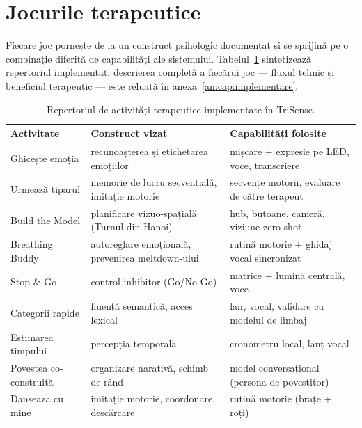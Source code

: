 \section{Jocurile terapeutice}

Fiecare joc pornește de la un construct psihologic documentat și se sprijină pe o combinație diferită de capabilități ale sistemului. Tabelul~\ref{tab:jocuri} sintetizează repertoriul implementat; descrierea completă a fiecărui joc — fluxul tehnic și beneficiul terapeutic — este reluată în anexa~\ref{an:cap:implementare}.

\begin{table}[htb]
    \centering
    \caption{Repertoriul de activități terapeutice implementate în TriSense.}
    \label{tab:jocuri}
    \small
    \begin{tabular}{|>{\raggedright\arraybackslash}p{3.4cm}|>{\raggedright\arraybackslash}p{4.3cm}|>{\raggedright\arraybackslash}p{5.3cm}|}
        \hline
        \textbf{Activitate} & \textbf{Construct vizat} & \textbf{Capabilități folosite} \\
        \hline
        Ghicește emoția & recunoașterea și etichetarea emoțiilor & mișcare + expresie pe LED, voce, transcriere \\
        Urmează tiparul & memorie de lucru secvențială, imitație motorie & secvențe motorii, evaluare de către terapeut \\
        Build the Model & planificare vizuo-spațială (Turnul din Hanoi) & hub, butoane, cameră, viziune zero-shot \\
        Breathing Buddy & autoreglare emoțională, prevenirea meltdown-ului & rutină motorie + ghidaj vocal sincronizat \\
        Stop \& Go & control inhibitor (Go/No-Go) & matrice + lumină centrală, voce \\
        Categorii rapide & fluență semantică, acces lexical & lanț vocal, validare cu modelul de limbaj \\
        Estimarea timpului & percepția temporală & cronometru local, lanț vocal \\
        Povestea co-construită & organizare narativă, schimb de rând & model conversațional (persona de povestitor) \\
        Dansează cu mine & imitație motorie, coordonare, descărcare & rutină motorie (brațe + roți) \\
        \hline
    \end{tabular}
\end{table}

